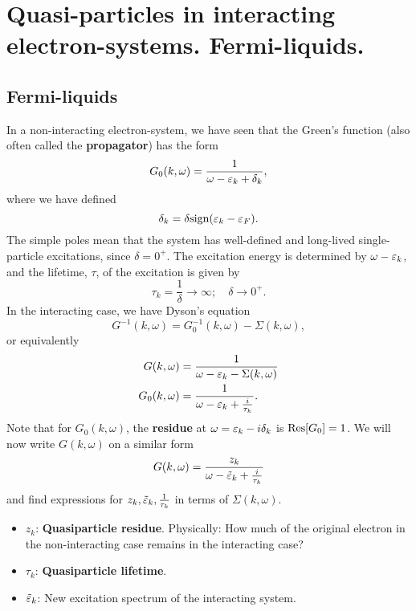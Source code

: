 \clearpage
\section{Quasi-particles in interacting electron-systems. Fermi-liquids.}

\subsection{Fermi-liquids}

In a non-interacting electron-system, we have seen that the Green's function (also often called the \textbf{propagator}) has the form 
\begin{equation} 
G_0(k,\omega) = \frac{1}{\omega-\varepsilon_k + \delta_k},
\end{equation}
where we have defined 
\begin{equation} 
\delta_k = \delta\text{sign}(\varepsilon_k-\varepsilon_F).
\end{equation}
The simple poles mean that the system has well-defined and long-lived single-particle excitations, since $\delta = 0^+$. The excitation energy is determined by $\omega-\varepsilon_k$, and the lifetime, $\tau$, of the excitation is given by 
\begin{equation} 
\tau_k =\frac{1}{\delta} \rightarrow \infty ; \quad \delta\rightarrow0^+.
\end{equation}
In the interacting case, we have Dyson's equation
\begin{equation} 
G^{-1}(k,\omega) = G_0^{-1}(k,\omega) - \Sigma(k,\omega),
\end{equation}
or equivalently
\begin{align} 
G(k,\omega) &= \frac{1}{\omega - \varepsilon_k - \Sigma(k,\omega)} \\
G_0(k,\omega) &= \frac{1}{\omega - \varepsilon_k+\frac{i}{\tau_k}}. 
\end{align}
Note that for $G_0(k,\omega)$, the \textbf{residue} at $\omega = \varepsilon_k-i\delta_k$ is $\Res[G_0] = 1$. 
We will now write $G(k, \omega)$ on a similar form 
\begin{equation} 
G(k,\omega) = \frac{z_k}{\omega-\tilde{\varepsilon}_k  + \frac{i}{\tau_k}}
\end{equation}
and find expressions for $z_k, \tilde{\varepsilon}_k, \frac{1}{\tau_k}$ in terms of $\Sigma(k,\omega)$. 
\begin{itemize}
	\item $z_k$: \textbf{Quasiparticle residue}. Physically: How much of the original electron in the non-interacting case remains in the interacting case?
	\item $\tau_k$: \textbf{Quasiparticle lifetime}. 
	\item $\tilde{\varepsilon}_k$: New excitation spectrum of the interacting system.
\end{itemize}
